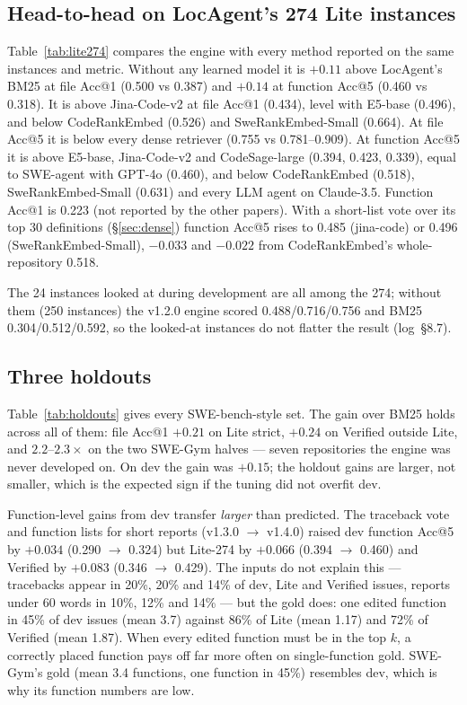 \documentclass[10pt,twocolumn]{article}
\makeatletter
\newcommand{\accat}[1]{Acc@#1}
\makeatother
\begin{document}



\subsection{Head-to-head on LocAgent's 274 Lite instances}
\label{sec:h2h}

Table~\ref{tab:lite274} compares the engine with every method reported on the same instances and
metric. Without any learned model it is $+0.11$ above LocAgent's BM25 at file \accat{1} (0.500 vs
0.387) and $+0.14$ at function \accat{5} (0.460 vs 0.318). It is above Jina-Code-v2 at file
\accat{1} (0.434), level with E5-base (0.496), and below CodeRankEmbed (0.526) and SweRankEmbed-Small
(0.664). At file \accat{5} it is below every dense retriever (0.755 vs 0.781--0.909). At function
\accat{5} it is above E5-base, Jina-Code-v2 and CodeSage-large (0.394, 0.423, 0.339), equal to
SWE-agent with GPT-4o (0.460), and below CodeRankEmbed (0.518), SweRankEmbed-Small (0.631) and every
LLM agent on Claude-3.5. Function \accat{1} is 0.223 (not reported by the other papers). With a
short-list vote over its top 30 definitions (\S\ref{sec:dense}) function \accat{5} rises to 0.485
(jina-code) or 0.496 (SweRankEmbed-Small), $-0.033$ and $-0.022$ from CodeRankEmbed's
whole-repository 0.518.

The 24 instances looked at during development are all among the 274; without them (250 instances)
the v1.2.0 engine scored 0.488/0.716/0.756 and BM25 0.304/0.512/0.592, so the looked-at instances do
not flatter the result (log~\S8.7).

\subsection{Three holdouts}
\label{sec:holdouts}

Table~\ref{tab:holdouts} gives every SWE-bench-style set. The gain over BM25 holds across all of
them: file \accat{1} $+0.21$ on Lite strict, $+0.24$ on Verified outside Lite, and $2.2$--$2.3\times$ on
the two SWE-Gym halves --- seven repositories the engine was never developed on. On dev the gain was
$+0.15$; the holdout gains are larger, not smaller, which is the expected sign if the tuning did not
overfit dev.

Function-level gains from dev transfer \emph{larger} than predicted. The traceback vote and function
lists for short reports (v1.3.0 $\to$ v1.4.0) raised dev function \accat{5} by $+0.034$
(0.290 $\to$ 0.324) but Lite-274 by $+0.066$ (0.394 $\to$ 0.460) and Verified by $+0.083$ (0.346
$\to$ 0.429). The inputs do not explain this --- tracebacks appear in 20\%, 20\% and 14\% of dev,
Lite and Verified issues, reports under 60 words in 10\%, 12\% and 14\% --- but the gold does: one
edited function in 45\% of dev issues (mean 3.7) against 86\% of Lite (mean 1.17) and 72\% of
Verified (mean 1.87). When every edited function must be in the top $k$, a correctly placed function
pays off far more often on single-function gold. SWE-Gym's gold (mean 3.4 functions, one function in
45\%) resembles dev, which is why its function numbers are low.
\end{document}
